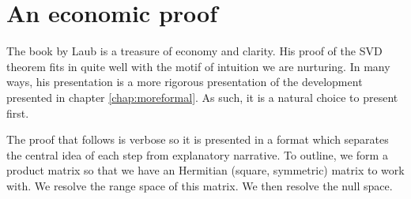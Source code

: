 \section{An economic proof}

The book by Laub is a treasure of economy and clarity. His proof\cite[p. 35]{Laub} of the SVD theorem fits in quite well with the motif of intuition we are nurturing. In many ways, his presentation is a more rigorous presentation of the development presented in chapter \eqref{chap:moreformal}. As such, it is a natural choice to present first.

The proof that follows is verbose so it is presented in a format which separates the central idea of each step from explanatory narrative. To outline, we form a product matrix so that we have an Hermitian (square, symmetric) matrix to work with. We resolve the range space of this matrix. We then resolve the null space.

